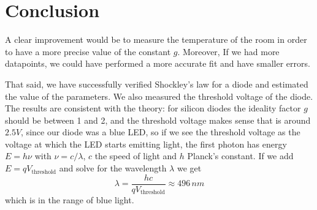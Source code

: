 \documentclass[notitlepage]{report}
\newcounter{theo}[section]\setcounter{theo}{0}
\numberwithin{equation}{section}
\theoremstyle{plain}
\theoremstyle{definition}
\theoremstyle{remark}
\begin{document}
\section{Conclusion}
A clear improvement would be to measure the temperature of
the room in order to have a more precise value of the constant \(g\). Moreover,
If we had more datapoints, we could have performed a more accurate fit and have
smaller errors. 

That said, we have successfully verified Shockley's law for a diode and
estimated the value of the parameters. We also measured the threshold voltage of
the diode. The results are consistent with the theory: for silicon diodes the
ideality factor \(g\) should be between 1 and 2, and the threshold voltage makes
sense that is around \(2.5V\), since our diode was a blue LED, so if we see the
threshold voltage as the voltage at which the LED starts emitting light, the
first photon has energy \(E = h\nu\) with \(\nu = c/\lambda \), \(c\) the speed of light and \(h\) Planck's constant. If we
add \(E = qV_\text{threshold}  \) and solve for the wavelength \(\lambda\) we get
\[
    \lambda = \frac{hc}{qV_\text{threshold}  } \approx 496 \, nm
\]
which is in the range of blue light.
\end{document}
